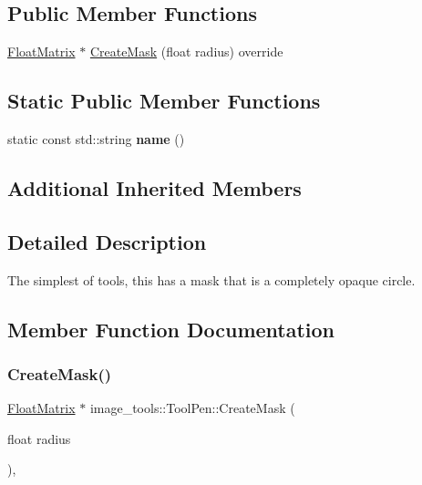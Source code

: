 \subsection*{Public Member Functions}
\begin{DoxyCompactItemize}
\item 
\hyperlink{classimage__tools_1_1FloatMatrix}{Float\+Matrix} $\ast$ \hyperlink{classimage__tools_1_1ToolPen_a27237b8843c611f80f59f8c00de4c835}{Create\+Mask} (float radius) override
\end{DoxyCompactItemize}
\subsection*{Static Public Member Functions}
\begin{DoxyCompactItemize}
\item 
\mbox{\label{classimage__tools_1_1ToolPen_aa5a82e88e162d8db4600139b8740c27b}} 
static const std\+::string {\bfseries name} ()
\end{DoxyCompactItemize}
\subsection*{Additional Inherited Members}


\subsection{Detailed Description}
The simplest of tools, this has a mask that is a completely opaque circle. 

\subsection{Member Function Documentation}
\mbox{\label{classimage__tools_1_1ToolPen_a27237b8843c611f80f59f8c00de4c835}} 
\subsubsection{\texorpdfstring{Create\+Mask()}{CreateMask()}}
{\footnotesize\ttfamily \hyperlink{classimage__tools_1_1FloatMatrix}{Float\+Matrix} $\ast$ image\+\_\+tools\+::\+Tool\+Pen\+::\+Create\+Mask (\begin{DoxyParamCaption}\item[{float}]{radius }\end{DoxyParamCaption})\hspace{0.3cm}{\ttfamily [override]}, {\ttfamily [virtual]}}


